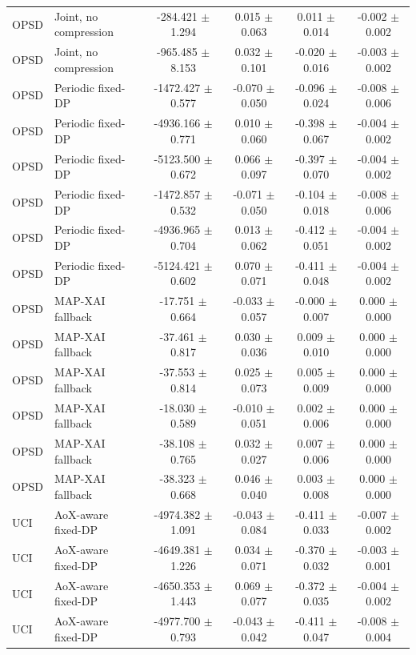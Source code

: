 \begin{tabular}{llcccc}
OPSD & Joint, no compression & -284.421 $\pm$ 1.294 & 0.015 $\pm$ 0.063 & 0.011 $\pm$ 0.014 & -0.002 $\pm$ 0.002 \\
OPSD & Joint, no compression & -965.485 $\pm$ 8.153 & 0.032 $\pm$ 0.101 & -0.020 $\pm$ 0.016 & -0.003 $\pm$ 0.002 \\
OPSD & Periodic fixed-DP & -1472.427 $\pm$ 0.577 & -0.070 $\pm$ 0.050 & -0.096 $\pm$ 0.024 & -0.008 $\pm$ 0.006 \\
OPSD & Periodic fixed-DP & -4936.166 $\pm$ 0.771 & 0.010 $\pm$ 0.060 & -0.398 $\pm$ 0.067 & -0.004 $\pm$ 0.002 \\
OPSD & Periodic fixed-DP & -5123.500 $\pm$ 0.672 & 0.066 $\pm$ 0.097 & -0.397 $\pm$ 0.070 & -0.004 $\pm$ 0.002 \\
OPSD & Periodic fixed-DP & -1472.857 $\pm$ 0.532 & -0.071 $\pm$ 0.050 & -0.104 $\pm$ 0.018 & -0.008 $\pm$ 0.006 \\
OPSD & Periodic fixed-DP & -4936.965 $\pm$ 0.704 & 0.013 $\pm$ 0.062 & -0.412 $\pm$ 0.051 & -0.004 $\pm$ 0.002 \\
OPSD & Periodic fixed-DP & -5124.421 $\pm$ 0.602 & 0.070 $\pm$ 0.071 & -0.411 $\pm$ 0.048 & -0.004 $\pm$ 0.002 \\
OPSD & MAP-XAI fallback & -17.751 $\pm$ 0.664 & -0.033 $\pm$ 0.057 & -0.000 $\pm$ 0.007 & 0.000 $\pm$ 0.000 \\
OPSD & MAP-XAI fallback & -37.461 $\pm$ 0.817 & 0.030 $\pm$ 0.036 & 0.009 $\pm$ 0.010 & 0.000 $\pm$ 0.000 \\
OPSD & MAP-XAI fallback & -37.553 $\pm$ 0.814 & 0.025 $\pm$ 0.073 & 0.005 $\pm$ 0.009 & 0.000 $\pm$ 0.000 \\
OPSD & MAP-XAI fallback & -18.030 $\pm$ 0.589 & -0.010 $\pm$ 0.051 & 0.002 $\pm$ 0.006 & 0.000 $\pm$ 0.000 \\
OPSD & MAP-XAI fallback & -38.108 $\pm$ 0.765 & 0.032 $\pm$ 0.027 & 0.007 $\pm$ 0.006 & 0.000 $\pm$ 0.000 \\
OPSD & MAP-XAI fallback & -38.323 $\pm$ 0.668 & 0.046 $\pm$ 0.040 & 0.003 $\pm$ 0.008 & 0.000 $\pm$ 0.000 \\
UCI & AoX-aware fixed-DP & -4974.382 $\pm$ 1.091 & -0.043 $\pm$ 0.084 & -0.411 $\pm$ 0.033 & -0.007 $\pm$ 0.002 \\
UCI & AoX-aware fixed-DP & -4649.381 $\pm$ 1.226 & 0.034 $\pm$ 0.071 & -0.370 $\pm$ 0.032 & -0.003 $\pm$ 0.001 \\
UCI & AoX-aware fixed-DP & -4650.353 $\pm$ 1.443 & 0.069 $\pm$ 0.077 & -0.372 $\pm$ 0.035 & -0.004 $\pm$ 0.002 \\
UCI & AoX-aware fixed-DP & -4977.700 $\pm$ 0.793 & -0.043 $\pm$ 0.042 & -0.411 $\pm$ 0.047 & -0.008 $\pm$ 0.004 \\

\end{tabular}
